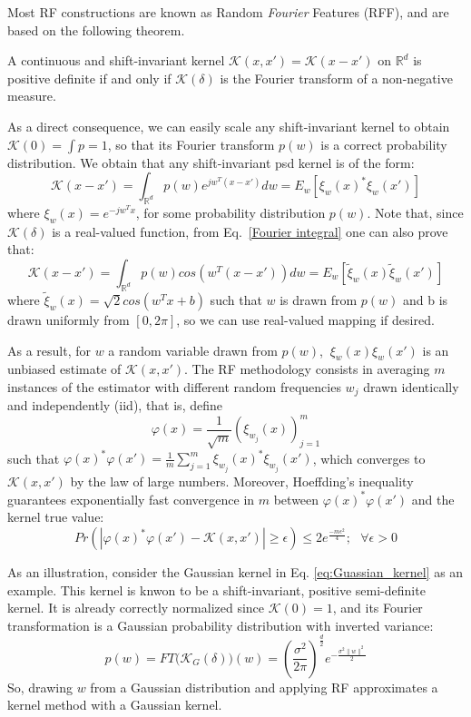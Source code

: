 Most RF constructions are known as Random \emph{Fourier} Features (RFF), and are based on the following theorem.
\begin{theorem}
A continuous and shift-invariant kernel $\mathcal{K}(x,x')=\mathcal{K}(x-x')$ on $\mathbb{R}^d$ is positive definite if and only if $\mathcal{K}(\delta)$ is the Fourier transform of a non-negative measure.
\end{theorem}
As a direct consequence, we can easily scale any shift-invariant kernel to obtain $\mathcal{K}(0) = \int p = 1$, so that its Fourier transform $p(w)$ is a correct probability distribution. We obtain that any shift-invariant psd kernel is of the form:
\begin{equation}
\label{Fourier integral}
\mathcal{K}(x-x')=\int_{\mathbb{R}^d}p(w)e^{jw^T(x-x')}dw= E_w[\xi_w(x)^*\xi_w(x')]
\end{equation}
where $\xi_w(x)=e^{-jw^Tx}$, for some probability distribution $p(w)$. Note that, since $\mathcal{K}(\delta)$ is a real-valued function, from Eq.~\ref{Fourier integral} one can also prove that:
\begin{equation}
\label{real Fourier integral}
\mathcal{K}(x-x')=\int_{\mathbb{R}^d}p(w)cos({w^T(x-x')})dw=E_w[\tilde \xi_w(x)\tilde \xi_w(x')]
\end{equation}
where $\tilde \xi_w(x)=\sqrt{2}cos(w^Tx+b)$ such that $w$ is drawn from $p(w)$ and b is drawn uniformly from $[0,2\pi]$, so we can use real-valued mapping if desired.

As a result, for $w$ a random variable drawn from $p(w)$, $\ \xi_w(x)\xi_w(x')$ is an unbiased estimate of $\mathcal{K}(x,x')$. The RF methodology consists in averaging $m$ instances of the estimator with different random frequencies $w_j$ drawn identically and independently (iid), that is, define
\[
\varphi(x) = \frac{1}{\sqrt{m}} ( \xi_{w_j}(x) )_{j=1}^m
\]
such that $\varphi(x)^*\varphi(x')=\frac{1}{m} \sum_{j=1}^m \xi_{w_j}(x)^*\xi_{w_j}(x')$, which converges to $\mathcal{K}(x,x')$ by the law of large numbers. Moreover, Hoeffding's inequality guarantees exponentially fast convergence in $m$ between $\varphi(x)^*\varphi(x')$ and the kernel true value:
\begin{equation}
    Pr(|\varphi(x)^*\varphi(x')-\mathcal{K}(x,x')|\geq\epsilon)\leq2e^\frac{-m\epsilon^2}{4};~~~ \forall \epsilon >0
\end{equation}

As an illustration, consider the Gaussian kernel in Eq. \ref{eq:Guassian_kernel} as an example. This kernel is knwon to be a shift-invariant, positive semi-definite kernel. It is already correctly normalized since $\mathcal{K}(0) = 1$, and its Fourier transformation is a Gaussian probability distribution with inverted variance:
\[p(w)=FT\big(\mathcal{K}_G(\delta)\big)(w)=(\frac{\sigma^2}{2\pi})^\frac{d}{2}e^{-\frac{\sigma^2\|w\|^2}{2}}\]
So, drawing $w$ from a Gaussian distribution and applying RF approximates a kernel method with a Gaussian kernel.

